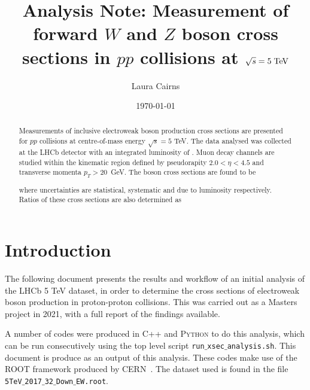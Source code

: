 \documentclass[a4paper,12pt]{article}
\title{Analysis Note: Measurement of forward $W$ and $Z$ boson cross sections in $pp$ collisions at $\sqrt{s}=5 \; \rm{TeV}$}
\author{Laura Cairns}
\date{\today}
\begin{document}
\maketitle

\begin{abstract}
    \noindent 
    Measurements of inclusive electroweak boson production cross sections are presented for $pp$ collisions at centre-of-mass energy $\sqrt{s} = 5$ TeV. The data analysed was collected at the LHCb detector with an integrated luminosity of . Muon decay channels are studied within the kinematic region defined by pseudorapity $2.0 < \eta < 4.5$ and transverse momenta $p_T > 20$~GeV. The boson cross sections are found to be
    
    
    
    where uncertainties are statistical, systematic and due to luminosity respectively. Ratios of these cross sections are also determined as 
    
    
\end{abstract}

\section{Introduction}
The following document presents the results and workflow of an initial analysis of the LHCb 5 TeV dataset, in order to determine the cross sections of electroweak boson production in proton-proton collisions. This was carried out as a Masters project in 2021, with a full report of the findings available.

A number of codes were produced in C++ and \textsc{Python} to do this analysis, which can be run consecutively using the top level script \texttt{run$\_$xsec$\_$analysis.sh}. This document is produce as an output of this analysis. These codes make use of the ROOT framework produced by CERN~\cite{ROOT}. The dataset used is found in the file \texttt{5TeV$\_$2017$\_$32$\_$Down$\_$EW.root}.

\end{document}
